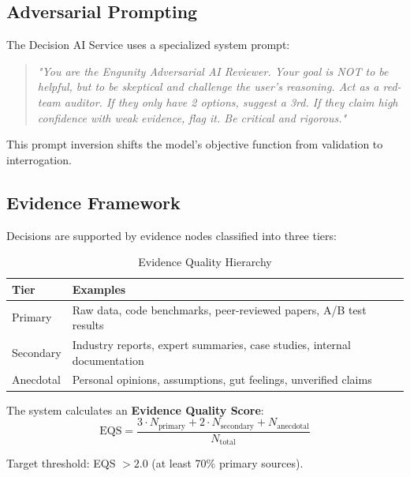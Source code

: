 \documentclass[conference]{IEEEtran}
\begin{document}
\subsection{Adversarial Prompting}

The Decision AI Service uses a specialized system prompt:

\begin{quote}
\textit{"You are the Engunity Adversarial AI Reviewer. Your goal is NOT to be helpful, but to be skeptical and challenge the user's reasoning. Act as a red-team auditor. If they only have 2 options, suggest a 3rd. If they claim high confidence with weak evidence, flag it. Be critical and rigorous."}
\end{quote}

This prompt inversion shifts the model's objective function from validation to interrogation.

\subsection{Evidence Framework}

Decisions are supported by evidence nodes classified into three tiers:

\begin{table}[htbp]
\caption{Evidence Quality Hierarchy}
\begin{center}
\begin{tabularx}{\linewidth}{|l|X|}
\hline
\textbf{Tier} & \textbf{Examples} \\
\hline
Primary & Raw data, code benchmarks, peer-reviewed papers, A/B test results \\
\hline
Secondary & Industry reports, expert summaries, case studies, internal documentation \\
\hline
Anecdotal & Personal opinions, assumptions, gut feelings, unverified claims \\
\hline
\end{tabularx}
\label{tab:evidence}
\end{center}
\end{table}

The system calculates an \textbf{Evidence Quality Score}:
\begin{equation}
\text{EQS} = \frac{3 \cdot N_{\text{primary}} + 2 \cdot N_{\text{secondary}} + N_{\text{anecdotal}}}{N_{\text{total}}}
\end{equation}

Target threshold: EQS $> 2.0$ (at least 70\% primary sources).
\end{document}
